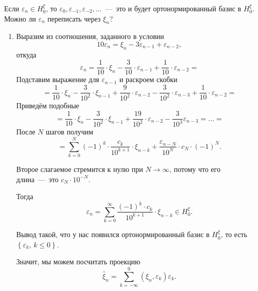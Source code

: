 Если $ \varepsilon_n \in H_0^{ \xi }$,
то $ \varepsilon_0, \varepsilon_{-1}, \varepsilon_{-2}, \dotsc $~---~это
и будет ортонормированный базис в $H_0^{ \xi }$.
Можно ли $ \varepsilon_n$ переписать через $ \xi_n$?
\begin{enumerate}[label=\alph*)]
  \item Выразим из соотношения, заданного в условии
  \begin{equation*}
    10 \varepsilon_n =
    \xi_n - 3 \varepsilon_{n - 1} + \varepsilon_{n - 2},
  \end{equation*}
  откуда
  \begin{equation*}
    \varepsilon_n =
    \frac{1}{10} \cdot \xi_n - \frac{3}{10} \cdot \varepsilon_{n - 1} +
    \frac{1}{10} \cdot \varepsilon_{n - 2} =
  \end{equation*}
  Подставим выражение для $ \varepsilon_{n - 1}$ и раскроем скобки
  \begin{equation*}
    = \frac{1}{10} \cdot \xi_n - \frac{3}{10^2} \cdot \xi_{n - 1} +
    \frac{9}{10^2} \cdot \varepsilon_{n - 2} - \frac{3}{10^2} \cdot \varepsilon_{n - 3} +
    \frac{1}{10} \cdot \varepsilon_{n - 2} =
  \end{equation*}
  Приведём подобные
  \begin{equation*}
    = \frac{1}{10} \cdot \xi_n - \frac{3}{10^2} \cdot \xi_{n - 1} +
    \frac{19}{10^2} \cdot \varepsilon_{n - 2} - \frac{3}{10^3} \varepsilon_{n - 3} =
    \dotsc =
  \end{equation*}
  После $N$ шагов получим
  \begin{equation*}
    = \sum \limits_{k = 0}^N \left( -1 \right)^k \cdot \frac{c_k}{10^{k + 1}} \cdot \xi_{n - k} +
    \frac{ \varepsilon_{n - N}}{10^N} \cdot c_N \cdot \left( -1 \right)^N.
  \end{equation*}

  Второе слагаемое стремится к нулю при $N \to \infty $, потому что его длина~---~это
  $c_N \cdot 10^{-N}$.

  Тогда
  \begin{equation*}
    \varepsilon_n =
    \sum \limits_{k = 0}^{ \infty }
      \frac{ \left( -1 \right)^k \cdot c_k}{10^{k + 1}} \cdot \xi_{n - k} \in
    H_0^{ \xi }.
  \end{equation*}

  Вывод такой, что у нас появился ортонормированный базис в $H_0^{ \xi }$,
  то есть $ \left\{ \varepsilon_k, \, k \leq 0 \right\} $.

  Значит, мы можем посчитать проекцию
  \begin{equation*}
    \hat{ \xi }_n =
    \sum \limits_{k = -\infty }^0 \left( \xi_n, \varepsilon_k \right) \varepsilon_k.
  \end{equation*}


\end{enumerate}
